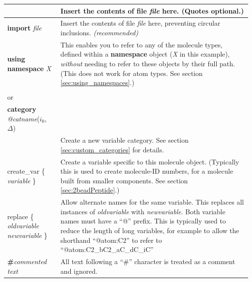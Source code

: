 \documentclass[11pt]{article}
\begin{document}
\begin{longtable}[h]{l|p{9cm}}
&
Insert the contents of file \textit{file} here. (Quotes optional.)
\\
\hline
\textbf{import} \textit{file}
&
Insert the contents of file \textit{file} here,
preventing circular inclusions.
\textit{(recommended)}
\\
\hline
\textbf{using namespace} \textit{X}
&
This enables you to refer to any of the molecule types,
defined within a \textbf{namespace} object (\textit{X} in this example),
\textit{without} needing to refer to these objects by their full path.
(This does not work for atom types.
See section \ref{sec:using_namespaces}.)
\\
\hline
\begin{tabular}[t]{l}
\textbf{category} \textit{\$catname}($i_0$, $\Delta$)
\\
or \\
\textbf{category} \textit{@catname}($i_0$, $\Delta$)
\\
\end{tabular}
&
Create a new variable category.
See section \ref{sec:custom_categories} for details.
\\
\hline
create\_var \{ \textit{variable} \} &
Create a variable specific to this molecule object. 
(Typically this is used to create molecule-ID numbers, 
for a molecule built from smaller components.
See section \ref{sec:2beadPeptide}.)
\\
\hline
replace \{ \textit{oldvariable} \textit{newvariable} \} &
Allow alternate names for the same variable.  This replaces all instances of \textit{oldvariable} with \textit{newvariable}.  Both variable names must have a ``@'' prefix.  This is typically used to reduce the length of long variables, for example to allow the shorthand ``@atom:C2'' to refer to ``@atom:C2\_bC2\_aC\_dC\_iC''
\\
\hline
 \textbf{\#}\textit{commented text} & 
All text following a ``\#'' character is treated as a comment and ignored.
\end{longtable}

\end{document}
